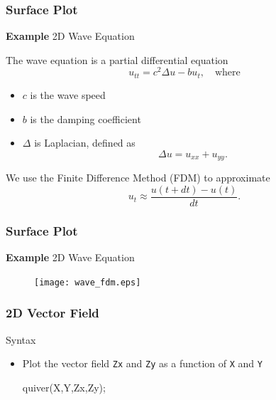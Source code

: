 \documentclass[compress]{beamer}  %
\begin{document}
\begin{frame}[fragile]
\frametitle{Surface Plot}
\textbf{Example} 2D Wave Equation

The wave equation is a partial differential equation
\begin{equation}\label{eq:wave_eq}
   u_{tt} = c^2 \Delta u - b u_t,\quad \mbox{where}
\end{equation}\pause
\begin{itemize}
    \item $c$ is the wave speed
    \item $b$ is the damping coefficient
    \item $\Delta$ is Laplacian, defined as
          \begin{equation}
          \Delta u = u_{xx} + u_{yy}.
          \end{equation}
\end{itemize}
\pause
We use the Finite Difference Method (FDM) to approximate
\begin{equation}
    u_t \approx \frac{u(t+dt) - u(t)}{dt}.
\end{equation}

\end{frame}
\begin{frame}[fragile]
\frametitle{Surface Plot}
\textbf{Example} 2D Wave Equation

\setcounter{subfigure}{0}
\begin{figure}
    \centering
    \texttt{[image: wave\_fdm.eps]}
\end{figure}

\end{frame}
\begin{frame}[fragile]
\frametitle{2D Vector Field}
\begin{block}{Syntax}
\begin{itemize}
    \item Plot the vector field \texttt{Zx} and \texttt{Zy} as a function of \texttt{X} and \texttt{Y}
          \begin{matlabcodebeamer}[numbers=none,frame=none]
          quiver(X,Y,Zx,Zy);
          \end{matlabcodebeamer}
\end{itemize}
\end{block}

\end{frame}
\end{document}
